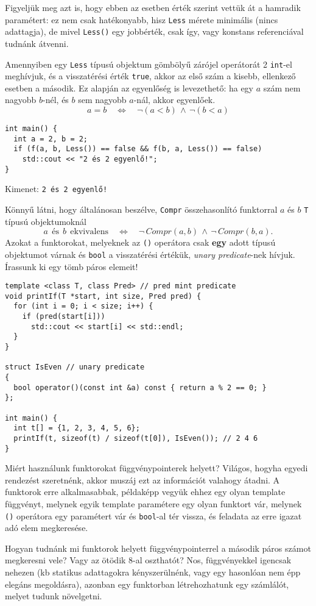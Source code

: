 \documentclass[../cpp_book/cpp_book.tex]{subfiles}
\begin{document}
	\begin{note}
		Figyeljük meg azt is, hogy ebben az esetben érték szerint vettük át a hamradik paramétert: ez nem csak hatékonyabb, hisz \texttt{Less} mérete minimális (nincs adattagja), de mivel \texttt{Less()} egy jobbérték, csak így, vagy konstans referenciával tudnánk átvenni.
	\end{note}
	
	Amennyiben egy \texttt{Less} típusú objektum gömbölyű zárójel operátorát 2 \texttt{int}-el meghívjuk, és a visszatérési érték \texttt{true}, akkor az első szám a kisebb, ellenkező esetben a második. Ez alapján az egyenlőség is levezethető: ha egy $a$ szám nem nagyobb $b$-nél, és $b$ sem nagyobb $a$-nál, akkor egyenlőek. 
	\[a = b \quad \Leftrightarrow \quad \neg(a<b)\, \wedge\, \neg(b<a)\]
	\begin{lstlisting}
int main() {
  int a = 2, b = 2;
  if (f(a, b, Less()) == false && f(b, a, Less()) == false)
    std::cout << "2 és 2 egyenlő!";
}
	\end{lstlisting}
	Kimenet: \texttt{2 és 2 egyenlő!}
	\smallskip
	
	Könnyű látni, hogy általánosan beszélve, \texttt{Compr} összehasonlító funktorral $a$ és $b$ \texttt{T} típusú objektumoknál
	\[ a\ \ \text{és}\ \ b\ \ \text{ekvivalens}\quad \Leftrightarrow\quad \neg \,Compr(a, b)\, \wedge\, \neg \,Compr(b, a). \]
	Azokat a funktorokat, melyeknek az \texttt{()} operátora csak \textbf{egy} adott típusú objektumot várnak és \texttt{bool} a visszatérési értékük, \textit{unary predicate}-nek hívjuk. Írassunk ki egy tömb páros elemeit!
	\begin{lstlisting}
template <class T, class Pred> // pred mint predicate
void printIf(T *start, int size, Pred pred) {
  for (int i = 0; i < size; i++) {
    if (pred(start[i]))
      std::cout << start[i] << std::endl;
  }
}

struct IsEven // unary predicate
{
  bool operator()(const int &a) const { return a % 2 == 0; }
};

int main() {
  int t[] = {1, 2, 3, 4, 5, 6};
  printIf(t, sizeof(t) / sizeof(t[0]), IsEven()); // 2 4 6
}
	\end{lstlisting}
	\begin{note}
		Miért használunk funktorokat függvénypointerek helyett? Világos, hogyha egyedi rendezést szeretnénk, akkor muszáj ezt az információt valahogy átadni. A funktorok erre alkalmasabbak, példaképp vegyük ehhez egy olyan template függvényt, melynek egyik template paramétere egy olyan funktort vár, melynek \texttt{()} operátora egy paramétert vár és \texttt{bool}-al tér vissza, és feladata az erre igazat adó elem megkeresése. 
		
		Hogyan tudnánk mi funktorok helyett függvénypointerrel a második páros számot megkeresni vele? Vagy az ötödik 8-al oszthatót? Nos, függvényekkel igencsak nehezen (kb statikus adattagokra kényszerülnénk, vagy egy hasonlóan nem épp elegáns megoldásra), azonban egy funktorban létrehozhatunk egy számlálót, melyet tudunk növelgetni.
	\end{note}
\end{document}
